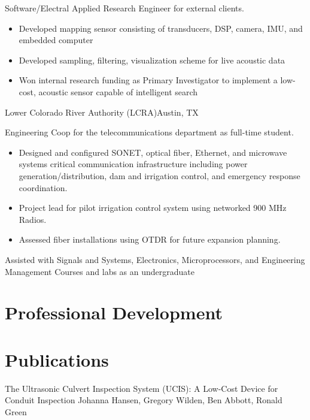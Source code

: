 \documentclass[11pt,a4paper,sans]{moderncv}
\begin{document}
{
Software/Electral Applied Research Engineer for external clients.  
     \begin{itemize}
        \item Developed mapping sensor consisting of transducers, DSP, 
            camera, IMU, and embedded computer 
        \item Developed sampling, filtering, visualization scheme for live acoustic data 
        \item Won internal research funding as Primary Investigator to 
            implement a low-cost, acoustic sensor capable of intelligent search 
    \end{itemize}
    }

            {Lower Colorado River Authority (LCRA)}{Austin, TX}{}
            {Engineering Coop for the telecommunications department 
            as full-time student.
 \begin{itemize}
        \item Designed and configured SONET, optical fiber, Ethernet, and microwave systems
            critical communication infrastructure including power generation/distribution, dam and 
            irrigation control, and emergency response coordination. 
        \item Project lead for pilot irrigation control system using networked
            900 MHz Radios. 
        \item Assessed fiber installations using OTDR for future expansion planning.
    \end{itemize}
}

{Assisted with Signals and Systems, Electronics, Microprocessors, and 
Engineering Management Courses and labs as an undergraduate}


\section{Professional Development}

\section{Publications}
        {The Ultrasonic Culvert Inspection System (UCIS): 
        A Low-Cost Device for Conduit Inspection}{}{}{}{}{}
        {Johanna Hansen, Gregory Wilden, Ben Abbott, Ronald Green}{}{}{}
\end{document}

